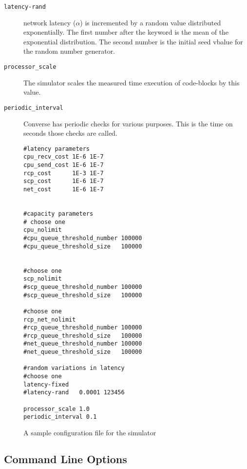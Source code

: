 \begin{description}
\item[{\tt latency-rand}] network latency ($\alpha$) is incremented by
                       a random value distributed exponentially. The first
                       number after the keyword is the mean of the
                       exponential distribution. The second number is the
                       initial seed vbalue for the random number generator.


\item[{\tt processor\_scale}] The simulator scales the measured time
                      execution of code-blocks by this value.

\item[{\tt periodic\_interval}] Converse has periodic checks for
                      various purposes. This is the time on seconds
                      those checks are called.
\end{description}


\begin{figure}
\begin{verbatim}
#latency parameters
cpu_recv_cost 1E-6 1E-7              
cpu_send_cost 1E-6 1E-7
rcp_cost      1E-3 1E-7
scp_cost      1E-6 1E-7
net_cost      1E-6 1E-7


#capacity parameters
# choose one 
cpu_nolimit
#cpu_queue_threshold_number 100000
#cpu_queue_threshold_size   100000


#choose one
scp_nolimit
#scp_queue_threshold_number 100000
#scp_queue_threshold_size   100000

#choose one
rcp_net_nolimit
#rcp_queue_threshold_number 100000
#rcp_queue_threshold_size   100000
#net_queue_threshold_number 100000
#net_queue_threshold_size   100000

#random variations in latency
#choose one
latency-fixed
#latency-rand   0.0001 123456

processor_scale 1.0
periodic_interval 0.1
\end{verbatim}
\caption{A sample configuration file for the simulator}
\label{fig:simconfig}
\end{figure}

\subsection[Command Line Options]{Command Line Options}
\label{command line options}

